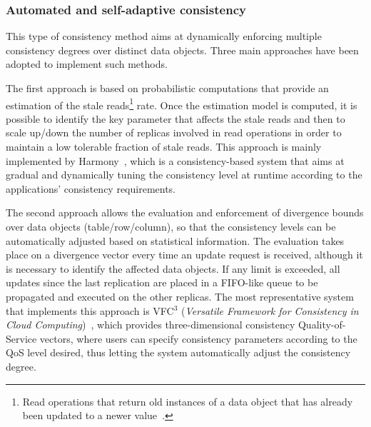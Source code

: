 
\subsubsection{Automated and self-adaptive consistency}

This type of consistency method aims at dynamically enforcing multiple consistency degrees over distinct data objects. Three main approaches have been adopted to implement such methods. 


The first approach is based on probabilistic computations that provide an estimation of the stale reads\footnote{ Read operations that return  old instances of a data object that has already been updated to a newer value~\cite{lu2015existential}.} rate. Once the estimation model is computed, it is possible to identify the key parameter that affects the stale reads and then to scale up/down the number of replicas involved in read operations in order to maintain a low tolerable fraction of stale reads. This approach is mainly implemented by Harmony~\cite{chihoub2012harmony}, which is a consistency-based system that aims at gradual and dynamically tuning the consistency level at runtime according to the applications' consistency requirements.

The second approach allows the evaluation and enforcement of divergence bounds over data objects (table/row/column), so that the consistency levels can be automatically adjusted based on statistical information. The evaluation takes place on a divergence vector every time an update request is received, although it is necessary to identify the affected data objects. If any limit is exceeded, all updates since the last replication are placed in a FIFO-like queue to be propagated and executed on the other replicas. 
The most representative system that implements this approach is VFC$^3$ (\textit{Versatile Framework for Consistency in Cloud Computing})~\cite{esteves2012quality}, which provides three-dimensional consistency Qual\-ity-of-Service vectors, where users can specify consistency parameters according to the QoS level desired, thus letting the system automatically adjust the consistency degree.

